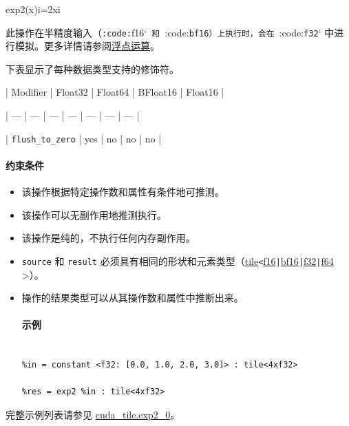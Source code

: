 \documentclass{article}
\begin{document}
exp2(x)i=2xi


此操作在半精度输入（\texttt{:code:}f16`\texttt{ 和 }:code:\texttt{bf16}\texttt{）上执行时，会在 }:code:\texttt{f32}` 中进行模拟。更多详情请参阅\href{https://docs.nvidia.com/cuda/tile-ir/latest/sections/operations.html#op-group-floating-point}{浮点运算}。



下表显示了每种数据类型支持的修饰符。



| Modifier | Float32 | Float64 | BFloat16 | Float16 |


| --- | --- | --- | --- | --- | --- | --- |


| \texttt{flush\_to\_zero} | yes | no | no | no |






\paragraph{约束条件}


\begin{itemize}
\item 该操作根据特定操作数和属性有条件地可推测。
\item 该操作可以无副作用地推测执行。
\item 该操作是纯的，不执行任何内存副作用。
\item \texttt{source} 和 \texttt{result} 必须具有相同的形状和元素类型（\href{https://docs.nvidia.com/cuda/tile-ir/latest/sections/types.html#type-tile}{tile}\texttt{<}\href{https://docs.nvidia.com/cuda/tile-ir/latest/sections/types.html#subsection-element-types}{f16}\texttt{|}\href{https://docs.nvidia.com/cuda/tile-ir/latest/sections/types.html#subsection-element-types}{bf16}\texttt{|}\href{https://docs.nvidia.com/cuda/tile-ir/latest/sections/types.html#subsection-element-types}{f32}\texttt{|}\href{https://docs.nvidia.com/cuda/tile-ir/latest/sections/types.html#subsection-element-types}{f64} >）。
\item 操作的结果类型可以从其操作数和属性中推断出来。




\paragraph{示例}


\begin{lstlisting}

%in = constant <f32: [0.0, 1.0, 2.0, 3.0]> : tile<4xf32>

%res = exp2 %in : tile<4xf32>

\end{lstlisting}



\end{itemize}
完整示例列表请参见 \href{https://docs.nvidia.com/cuda/tile-ir/latest/sections/appendix.html#example-cuda-tile-exp2-0}{cuda\_tile.exp2\_0}。
\end{document}
